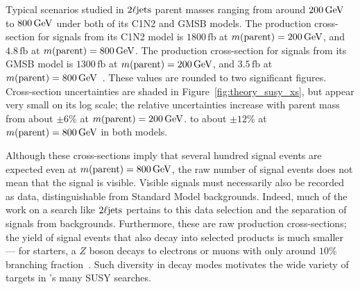 Typical scenarios studied in $\twoljets$ parent masses ranging from
around $200\,\eV[G]$ to $800\,\eV[G]$ under both of its C1N2 and GMSB models.
The production cross-section for signals from its C1N2 model is
$1800\,\mathrm{fb}$ at $m(\mathrm{parent}) = 200\,\eV[G]$,
and $4.8\,\mathrm{fb}$ at $m(\mathrm{parent}) = 800\,\eV[G]$.
The production cross-section for signals from its GMSB model is
$1300\,\mathrm{fb}$ at $m(\mathrm{parent}) = 200\,\eV[G]$,
and $3.5\,\mathrm{fb}$ at $m(\mathrm{parent}) = 800\,\eV[G]$~\cite{
Fuks:2012qx,Fuks:2013vua}.
These values are rounded to two significant figures.
Cross-section uncertainties are shaded in  Figure~\ref{fig:theory_susy_xs},
but appear very small on its log scale;
the relative uncertainties increase with parent mass from about
$\pm 6\%$ at $m(\mathrm{parent}) = 200\,\eV[G]$.
to about
$\pm 12\%$ at $m(\mathrm{parent}) = 800\,\eV[G]$
in both models.

Although these cross-sections imply that several hundred signal events are
expected even at $m(\mathrm{parent}) = 800\,\eV[G]$, the raw number of signal
events does not mean that the signal is visible.
Visible signals must necessarily also be recorded as data,
distinguishable from Standard Model backgrounds.
Indeed, much of the work on a search like $\twoljets$ pertains to this
data selection and the separation of signals from backgrounds.
Furthermore, these are raw production cross-sections;
the yield of signal events that also decay into selected products is much
smaller ---
for starters, a $Z$ boson decays to electrons or muons with only around
$10\%$ branching fraction~\cite{pdg2022ynf}.
Such diversity in decay modes motivates the wide variety of targets in
\atlas's many SUSY searches.


